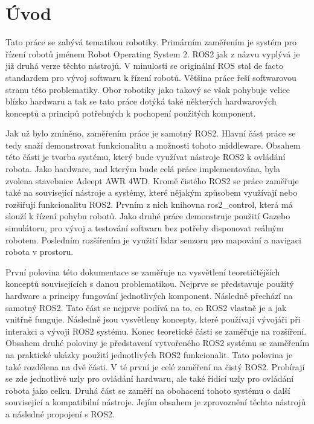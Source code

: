 
%

\chapter{Úvod}
Tato práce se zabývá tematikou robotiky. Primárním zaměřením je systém pro řízení robotů jménem Robot Operating System 2. ROS2 jak z názvu vyplývá je již druhá verze těchto nástrojů. V minulosti se originální ROS stal de facto standardem pro vývoj softwaru k řízení robotů. Většina práce řeší softwarovou stranu této problematiky. Obor robotiky jako takový se však pohybuje velice blízko hardwaru a tak se tato práce dotýká také některých hardwarových konceptů a principů potřebných k pochopení použitých komponent.

Jak už bylo zmíněno, zaměřením práce je samotný ROS2. Hlavní část práce se tedy snaží demonstrovat funkcionalitu a možnosti tohoto middleware. Obsahem této části je tvorba systému, který bude využívat nástroje ROS2 k ovládání robota. Jako hardware, nad kterým bude celá práce implementována, byla zvolena stavebnice Adeept AWR 4WD. Kromě čistého ROS2 se práce zaměřuje také na související nástroje a systémy, které nějakým způsobem využívají nebo rozšiřují funkcionalitu ROS2. Prvním z nich knihovna ros2\_control, která má slouží k řízení pohybu robotů. Jako druhé práce demonstruje použití Gazebo simulátoru, pro vývoj a testování softwaru bez potřeby disponovat reálným robotem. Posledním rozšířením je využití lidar senzoru pro mapování a navigaci robota v prostoru.

První polovina této dokumentace se zaměřuje na vysvětlení teoretičtějších konceptů souvisejících s danou problematikou. Nejprve se představuje použitý hardware a principy fungování jednotlivých komponent. Následně přechází na samotný ROS2. Tato část se nejprve podívá na to, co ROS2 vlastně je a jak vnitřně funguje. Následně jsou vysvětleny koncepty, které používají vývojáři při interakci a vývoji ROS2 systému. Konec teoretické části se zaměřuje na rozšíření.
Obsahem druhé poloviny je představení vytvořeného ROS2 systému se zaměřením na praktické ukázky použití jednotlivých ROS2 funkcionalit. Tato polovina je také rozdělena na dvě části. V té první je celé zaměření na čistý ROS2. Probírají se zde jednotlivé uzly pro ovládání hardwaru, ale také řídící uzly pro ovládání robota jako celku. Druhá část se zaměří na obohacení tohoto systému o další související a kompatibilní nástroje. Jejím obsahem je zprovoznění těchto nástrojů a následné propojení s ROS2.

